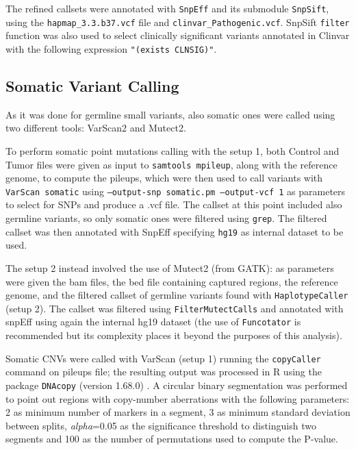 \documentclass[11pt]{article}
\begin{document}
The refined callsets were annotated with \texttt{SnpEff}\cite{cingolani2012program} and its submodule \texttt{SnpSift}\cite{cingolani2012using}, using the \texttt{hapmap\_3.3.b37.vcf} file and \texttt{clinvar\_Pathogenic.vcf}. SnpSift \texttt{filter} function was also used to select clinically significant variants annotated in Clinvar with the following expression \texttt{"(exists CLNSIG)"}. 



\subsection*{Somatic Variant Calling}

As it was done for germline small variants, also somatic ones were called using two different tools: VarScan2 and Mutect2. 

To perform somatic point mutations calling with the setup 1, both Control and Tumor files were given as input to \texttt{samtools mpileup}, along with the reference genome, to compute the pileups, which were then used to call variants with \texttt{VarScan somatic} using \texttt{--output-snp somatic.pm --output-vcf 1} as parameters to select for SNPs and produce a .vcf file. The callset at this point included also germline variants, so only somatic ones were filtered using \texttt{grep}. The filtered callset was then annotated with SnpEff specifying \texttt{hg19} as internal dataset to be used.

The setup 2 instead involved the use of Mutect2 (from GATK): as parameters were given the bam files, the bed file containing captured regions, the reference genome, and the filtered callset of germline variants found with \texttt{HaplotypeCaller} (setup 2). The callset was filtered using \texttt{FilterMutectCalls} and annotated with snpEff using again the internal hg19 dataset (the use of \texttt{Funcotator} is recommended but its complexity places it beyond the purposes of this analysis). 

Somatic CNVs were called with VarScan (setup 1) running the \texttt{copyCaller} command on pileups file; the resulting output was processed in R using the package \texttt{DNAcopy} (version 1.68.0) \cite{DNAcopy}. A circular binary segmentation was performed to point out regions with copy-number aberrations with the following parameters: 2 as minimum number of markers in a segment, 3 as minimum standard deviation between splits, \textit{alpha}=0.05 as the significance threshold to distinguish two segments and 100 as the number of permutations used to compute the P-value.
\end{document}

